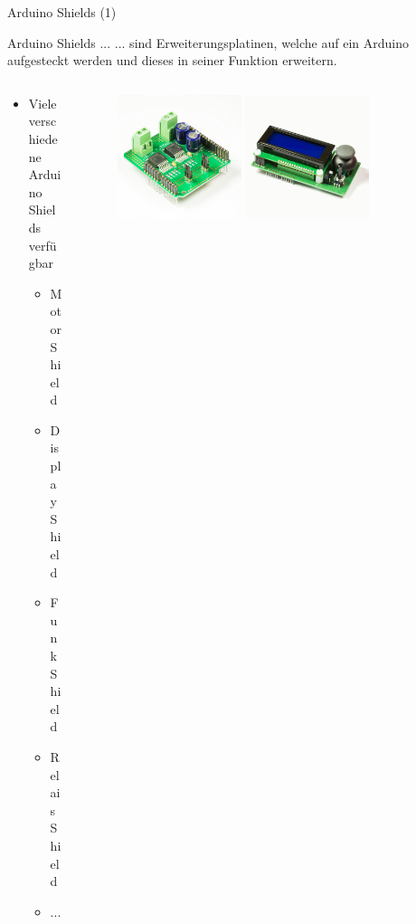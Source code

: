\documentclass{beamer}
\begin{document}
\begin{frame}{Arduino Shields (1)}
\begin{alertblock}{Arduino Shields ...}
... sind Erweiterungsplatinen, welche auf ein Arduino aufgesteckt werden und dieses in seiner Funktion erweitern.
\end{alertblock}
\begin{columns}
	\begin{column}{0.5\textwidth}
	\begin{itemize}
		\item Viele verschiedene Arduino Shields verf\"ugbar
		\begin{itemize}
			\item Motor Shield
			\item Display Shield
			\item Funk Shield
			\item Relais Shield
			\item ...
		\end{itemize}
	\end{itemize}
	\end{column}
	\begin{column}{0.5\textwidth}
		\begin{figure}
			\centering
			\includegraphics[width=0.4\textwidth]{./images/highpower-motorshield.jpg}
			\includegraphics[width=0.4\textwidth]{./images/display-shield.jpg}\\

\end{figure}
\end{column}
\end{columns}
\end{frame}
\end{document}
